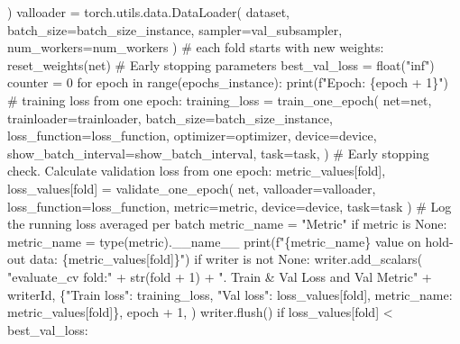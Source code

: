 \documentclass[
  letterpaper,
  DIV=11,
  numbers=noendperiod]{scrreprt}
\newenvironment{Shaded}{\begin{snugshade}}{\end{snugshade}}
\newcommand{\NormalTok}[1]{\textcolor[rgb]{0.00,0.23,0.31}{#1}}
\begin{document}
\begin{Shaded}
\begin{Highlighting}[]
\NormalTok{            )}
\NormalTok{            valloader = torch.utils.data.DataLoader(}
\NormalTok{                dataset, batch\_size=batch\_size\_instance, }
\NormalTok{                sampler=val\_subsampler, num\_workers=num\_workers}
\NormalTok{            )}
\NormalTok{            \# each fold starts with new weights:}
\NormalTok{            reset\_weights(net)}
\NormalTok{            \# Early stopping parameters}
\NormalTok{            best\_val\_loss = float("inf")}
\NormalTok{            counter = 0}
\NormalTok{            for epoch in range(epochs\_instance):}
\NormalTok{                print(f"Epoch: \{epoch + 1\}")}
\NormalTok{                \# training loss from one epoch:}
\NormalTok{                training\_loss = train\_one\_epoch(}
\NormalTok{                    net=net,}
\NormalTok{                    trainloader=trainloader,}
\NormalTok{                    batch\_size=batch\_size\_instance,}
\NormalTok{                    loss\_function=loss\_function,}
\NormalTok{                    optimizer=optimizer,}
\NormalTok{                    device=device,}
\NormalTok{                    show\_batch\_interval=show\_batch\_interval,}
\NormalTok{                    task=task,}
\NormalTok{                )}
\NormalTok{                \# Early stopping check. Calculate validation loss from one epoch:}
\NormalTok{                metric\_values[fold], loss\_values[fold] = validate\_one\_epoch(}
\NormalTok{                    net, valloader=valloader, loss\_function=loss\_function, }
\NormalTok{                    metric=metric, device=device, task=task}
\NormalTok{                )}
\NormalTok{                \# Log the running loss averaged per batch}
\NormalTok{                metric\_name = "Metric"}
\NormalTok{                if metric is None:}
\NormalTok{                    metric\_name = type(metric).\_\_name\_\_}
\NormalTok{                    print(f"\{metric\_name\} value on hold{-}out data: }
\NormalTok{                        \{metric\_values[fold]\}")}
\NormalTok{                if writer is not None:}
\NormalTok{                    writer.add\_scalars(}
\NormalTok{                        "evaluate\_cv fold:" + str(fold + 1) + }
\NormalTok{                        ". Train \& Val Loss and Val Metric" + writerId,}
\NormalTok{                        \{"Train loss": training\_loss, "Val loss": }
\NormalTok{                        loss\_values[fold], metric\_name: metric\_values[fold]\},}
\NormalTok{                        epoch + 1,}
\NormalTok{                    )}
\NormalTok{                    writer.flush()}
\NormalTok{                if loss\_values[fold] \textless{} best\_val\_loss:}

\end{Highlighting}
\end{Shaded}
\end{document}
